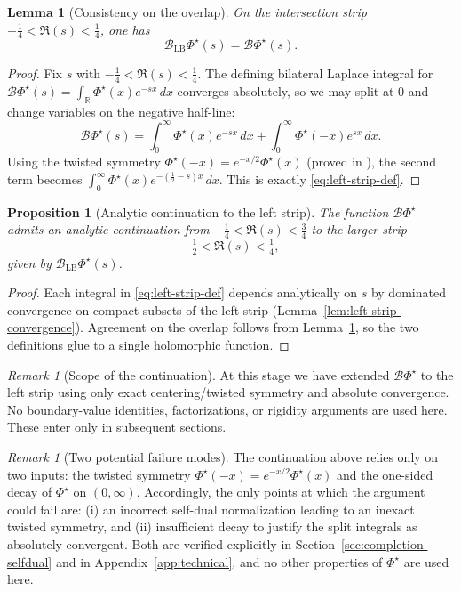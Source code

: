 \documentclass[11pt]{amsart}
\newtheorem{proposition}[theorem]{Proposition}
\newtheorem{lemma}[theorem]{Lemma}
\theoremstyle{definition}
\theoremstyle{remark}
\newtheorem{remark}[theorem]{Remark}
\newcommand{\R}{\mathbb{R}}
\begin{document}
\begin{lemma}[Consistency on the overlap]
\label{lem:overlap}
On the intersection strip $-\tfrac14<\Re(s)<\tfrac14$, one has
\[
\mathcal B_{\mathrm{LB}}\Phi^{\star}(s)=\mathcal B\Phi^{\star}(s).
\]
\end{lemma}

\begin{proof}
Fix $s$ with $-\tfrac14<\Re(s)<\tfrac14$. The defining bilateral Laplace integral
for $\mathcal B\Phi^{\star}(s)=\int_{\R}\Phi^{\star}(x)e^{-sx}\,dx$ converges absolutely,
so we may split at $0$ and change variables on the negative half-line:
\[
\mathcal B\Phi^{\star}(s)
=
\int_{0}^{\infty}\Phi^{\star}(x)e^{-sx}\,dx
+
\int_{0}^{\infty}\Phi^{\star}(-x)e^{sx}\,dx.
\]
Using the twisted symmetry $\Phi^{\star}(-x)=e^{-x/2}\Phi^{\star}(x)$ (proved in \cite{PaperI}),
the second term becomes $\int_{0}^{\infty}\Phi^{\star}(x)e^{-(\frac12-s)x}\,dx$.
This is exactly \eqref{eq:left-strip-def}.
\end{proof}

\begin{proposition}[Analytic continuation to the left strip]
\label{prop:left-strip-continuation}
The function $\mathcal B\Phi^{\star}$ admits an analytic continuation from
$-\tfrac14<\Re(s)<\tfrac34$ to the larger strip
\[
-\tfrac12<\Re(s)<\tfrac14,
\]
given by $\mathcal B_{\mathrm{LB}}\Phi^{\star}(s)$.
\end{proposition}

\begin{proof}
Each integral in \eqref{eq:left-strip-def} depends analytically on $s$ by dominated
convergence on compact subsets of the left strip (Lemma~\ref{lem:left-strip-convergence}).
Agreement on the overlap follows from Lemma~\ref{lem:overlap}, so the two definitions glue to a
single holomorphic function.
\end{proof}

\begin{remark}[Scope of the continuation]
At this stage we have extended $\mathcal B\Phi^{\star}$ to the left strip using
only exact centering/twisted symmetry and absolute convergence. No boundary-value identities,
factorizations, or rigidity arguments are used here. These enter only in subsequent sections.
\end{remark}

\begin{remark}[Two potential failure modes]
The continuation above relies only on two inputs: the twisted symmetry
$\Phi^{\star}(-x)=e^{-x/2}\Phi^{\star}(x)$ and the one-sided decay of $\Phi^{\star}$ on $(0,\infty)$.
Accordingly, the only points at which the argument could fail are:
(i) an incorrect self-dual normalization leading to an inexact twisted symmetry, and
(ii) insufficient decay to justify the split integrals as absolutely convergent.
Both are verified explicitly in Section~\ref{sec:completion-selfdual} and in Appendix~\ref{app:technical},
and no other properties of $\Phi^{\star}$ are used here.
\end{remark}
\end{document}
